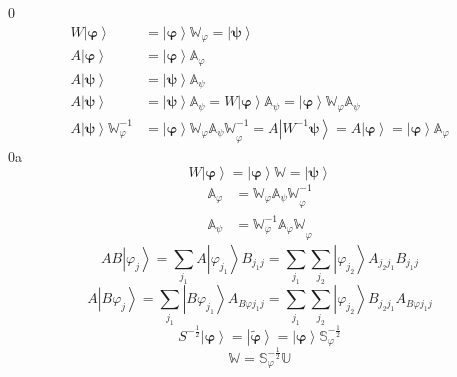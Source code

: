 \documentclass[aps,preprint]{revtex4}%
\begin{document}
0%
\begin{align}
W\left\vert \mathbf{\varphi}\right\rangle  &  =\left\vert \mathbf{\varphi
}\right\rangle \mathbb{W}_{\varphi}=\left\vert \mathbf{\psi}\right\rangle \\
A\left\vert \mathbf{\varphi}\right\rangle  &  =\left\vert \mathbf{\varphi
}\right\rangle \mathbb{A}_{\varphi}\\
A\left\vert \mathbf{\psi}\right\rangle  &  =\left\vert \mathbf{\psi
}\right\rangle \mathbb{A}_{\psi}\\
A\left\vert \mathbf{\psi}\right\rangle  &  =\left\vert \mathbf{\psi
}\right\rangle \mathbb{A}_{\psi}=W\left\vert \mathbf{\varphi}\right\rangle
\mathbb{A}_{\psi}=\left\vert \mathbf{\varphi}\right\rangle \mathbb{W}%
_{\varphi}\mathbb{A}_{\psi}\\
A\left\vert \mathbf{\psi}\right\rangle \mathbb{W}_{\varphi}^{-1} &
=\left\vert \mathbf{\varphi}\right\rangle \mathbb{W}_{\varphi}%
\mathbb{\mathbb{A}_{\psi}W}_{\mathbb{\varphi}}^{-1}=A\left\vert W^{-1}%
\mathbf{\psi}\right\rangle =A\left\vert \mathbf{\varphi}\right\rangle
=\left\vert \mathbf{\varphi}\right\rangle \mathbb{A}_{\varphi}%
\end{align}
0a%
\[
W\left\vert \mathbf{\varphi}\right\rangle =\left\vert \mathbf{\varphi
}\right\rangle \mathbb{W}=\left\vert \mathbf{\psi}\right\rangle
\]%
\begin{align}
\mathbb{A}_{\varphi} &  =\mathbb{W}_{\varphi}\mathbb{\mathbb{A}_{\psi}%
W}_{\mathbb{\varphi}}^{-1}\\
\mathbb{A}_{\psi} &  =\mathbb{W}_{\mathbb{\varphi}}^{-1}\mathbb{\mathbb{A}%
_{\varphi}W}_{\varphi}%
\end{align}%
\begin{equation}
AB\left\vert \varphi_{j}\right\rangle =\sum_{j_{1}}A\left\vert \varphi_{j_{1}%
}\right\rangle B_{j_{1}j}=\sum_{j_{1}}\sum_{j_{2}}\left\vert \varphi_{j_{2}%
}\right\rangle A_{j_{2}j_{1}}B_{j_{1}j}%
\end{equation}%
\begin{equation}
A\left\vert B\varphi_{j}\right\rangle =\sum_{j_{1}}\left\vert B\varphi_{j_{1}%
}\right\rangle A_{B\varphi j_{1}j}=\sum_{j_{1}}\sum_{j_{2}}\left\vert
\varphi_{j_{2}}\right\rangle B_{j_{2}j_{1}}A_{B\varphi j_{1}j}%
\end{equation}%
\[
S^{-\frac{1}{2}}\left\vert \mathbf{\varphi}\right\rangle =\left\vert
\mathbf{\tilde{\varphi}}\right\rangle =\left\vert \mathbf{\varphi
}\right\rangle \mathbb{S}_{\varphi}^{-\frac{1}{2}}%
\]%
\begin{equation}
\mathbb{W}\mathbb{=S}_{\varphi}^{-\frac{1}{2}}\mathbb{U}%
\end{equation}
\end{document}

